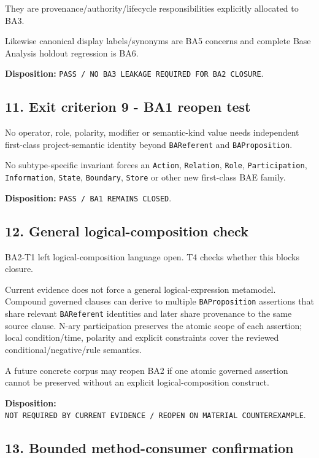 \documentclass[11pt,a4paper]{article}
\begin{document}
They are provenance/authority/lifecycle responsibilities explicitly allocated to BA3.

Likewise canonical display labels/synonyms are BA5 concerns and complete Base Analysis holdout regression is BA6.

\textbf{Disposition:} \texttt{PASS\ /\ NO\ BA3\ LEAKAGE\ REQUIRED\ FOR\ BA2\ CLOSURE}.

\subsection{11. Exit criterion 9 - BA1 reopen test}\label{exit-criterion-9---ba1-reopen-test}

No operator, role, polarity, modifier or semantic-kind value needs independent first-class project-semantic identity beyond \texttt{BAReferent} and \texttt{BAProposition}.

No subtype-specific invariant forces an \texttt{Action}, \texttt{Relation}, \texttt{Role}, \texttt{Participation}, \texttt{Information}, \texttt{State}, \texttt{Boundary}, \texttt{Store} or other new first-class BAE family.

\textbf{Disposition:} \texttt{PASS\ /\ BA1\ REMAINS\ CLOSED}.

\subsection{12. General logical-composition check}\label{general-logical-composition-check}

BA2-T1 left logical-composition language open. T4 checks whether this blocks closure.

Current evidence does not force a general logical-expression metamodel. Compound governed clauses can derive to multiple \texttt{BAProposition} assertions that share relevant \texttt{BAReferent} identities and later share provenance to the same source clause. N-ary participation preserves the atomic scope of each assertion; local condition/time, polarity and explicit constraints cover the reviewed conditional/negative/rule semantics.

A future concrete corpus may reopen BA2 if one atomic governed assertion cannot be preserved without an explicit logical-composition construct.

\textbf{Disposition:} \texttt{NOT\ REQUIRED\ BY\ CURRENT\ EVIDENCE\ /\ REOPEN\ ON\ MATERIAL\ COUNTEREXAMPLE}.

\subsection{13. Bounded method-consumer confirmation}\label{bounded-method-consumer-confirmation}
\end{document}
